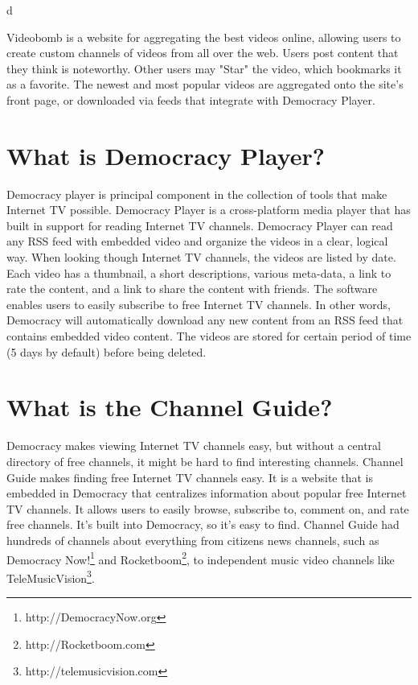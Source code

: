 d\documentclass[a4paper,12pt]{report}
\begin{document}
Videobomb is a website for aggregating the best videos online, allowing users to create custom channels of videos from all over the web. 
Users post content that they think is noteworthy. 
Other users may "Star" the video, which bookmarks it as a favorite. 
The newest and most popular videos are aggregated onto the site's front page, or downloaded via feeds that integrate with Democracy Player.

\section{What is Democracy Player?}
Democracy player is principal component in the collection of tools that make Internet TV possible.
Democracy Player is a cross-platform media player that has built in support for reading Internet TV channels.
Democracy Player can read any RSS feed with embedded video and organize the videos in a clear, logical way.
When looking though Internet TV channels, the videos are listed by date. Each video has a thumbnail, a short descriptions, various meta-data, a link to rate the content, and a link to share the content with friends.
The software enables users to easily subscribe to free Internet TV channels.
In other words, Democracy will automatically download any new content from an RSS feed that contains embedded video content.
The videos are stored for certain period of time (5 days by default) before being deleted.

\section {What is the Channel Guide?}
Democracy makes viewing Internet TV channels easy, but without a central directory of free channels, it might be hard to find interesting channels.
Channel Guide makes finding free Internet TV channels easy.
It is a website that is embedded in Democracy that centralizes information about popular free Internet TV channels.
It allows users to easily browse, subscribe to, comment on, and rate free channels.
It's built into Democracy, so it's easy to find.
Channel Guide had hundreds of channels about everything from citizens news channels, such as Democracy Now!\footnote {http://DemocracyNow.org} and Rocketboom\footnote {http://Rocketboom.com}, to independent music video channels like TeleMusicVision\footnote{http://telemusicvision.com}.
\end{document}
